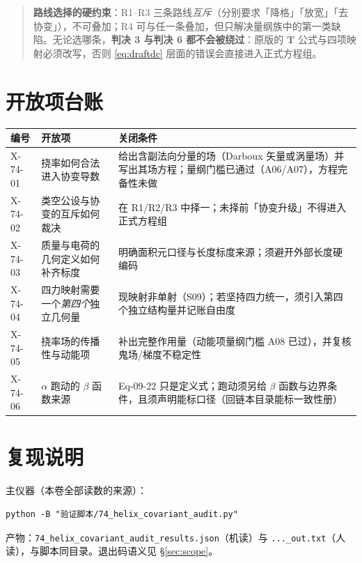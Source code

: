 \documentclass[UTF8,fontset=fandol,11pt]{ctexart}
\newcommand{\bx}{\boldsymbol}
\newcommand{\code}[1]{\texttt{#1}}
\begin{document}
\begin{quote}
\textbf{路线选择的硬约束}：R1--R3 三条路线\emph{互斥}（分别要求「降格」「放宽」「去协变」），不可叠加；R4 可与任一条叠加，但只解决量纲族中的第一类缺陷。无论选哪条，\textbf{判决 3 与判决 6 都不会被绕过}：原版的 $\dot{\bx T}$ 公式与四项映射必须改写，否则 \eqref{eq:draftdc} 层面的错误会直接进入正式方程组。
\end{quote}

\section{开放项台账}
\label{sec:open}

\begin{center}
\begin{tabular}{p{2.2cm}p{6.2cm}p{5.4cm}}
\toprule
编号 & 开放项 & 关闭条件 \\
\midrule
X-74-01 & 挠率如何合法进入协变导数 & 给出含副法向分量的场（Darboux 矢量或涡量场）并写出其场方程；量纲门槛已通过（A06/A07），方程完备性未做 \\
X-74-02 & 类空公设与协变的互斥如何裁决 & 在 R1/R2/R3 中择一；未择前「协变升级」不得进入正式方程组 \\
X-74-03 & 质量与电荷的几何定义如何补齐标度 & 明确面积元口径与长度标度来源；须避开外部长度硬编码 \\
X-74-04 & 四力映射需要一个\emph{第四个}独立几何量 & 现映射非单射（S09）；若坚持四力统一，须引入第四个独立结构量并记账自由度 \\
X-74-05 & 挠率场的传播性与动能项 & 补出完整作用量（动能项量纲门槛 A08 已过），并复核鬼场/梯度不稳定性 \\
X-74-06 & $\alpha$ 跑动的 $\beta$ 函数来源 & Eq-09-22 只是定义式；跑动须另给 $\beta$ 函数与边界条件，且须声明能标口径（回链本目录能标一致性册） \\
\bottomrule
\end{tabular}
\end{center}

\section{复现说明}
\label{sec:repro}

主仪器（本卷全部读数的来源）：
\begin{verbatim}
python -B "验证脚本/74_helix_covariant_audit.py"
\end{verbatim}
产物：\code{74\_helix\_covariant\_audit\_results.json}（机读）与 \code{...\_out.txt}（人读），与脚本同目录。退出码语义见 \S\ref{sec:scope}。
\end{document}
